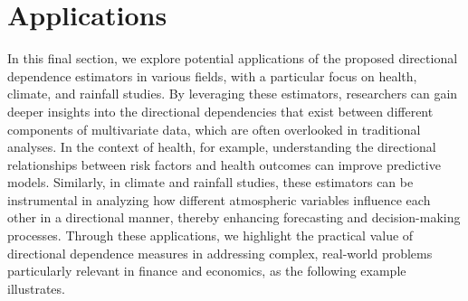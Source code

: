 \documentclass[11pt,a4paper]{article}
\begin{document}
\section{Applications}\label{sec:appl}
In this final section, we explore potential applications of the proposed directional dependence estimators in various fields, with a particular focus on health, climate, and rainfall studies. By leveraging these estimators, researchers can gain deeper insights into the directional dependencies that exist between different components of multivariate data, which are often overlooked in traditional analyses. In the context of health, for example, understanding the directional relationships between risk factors and health outcomes can improve predictive models. Similarly, in climate and rainfall studies, these estimators can be instrumental in analyzing how different atmospheric variables influence each other in a directional manner, thereby enhancing forecasting and decision-making processes. Through these applications, we highlight the practical value of directional dependence measures in addressing complex, real-world problems particularly relevant in finance and economics, as the following example illustrates.
\end{document}

